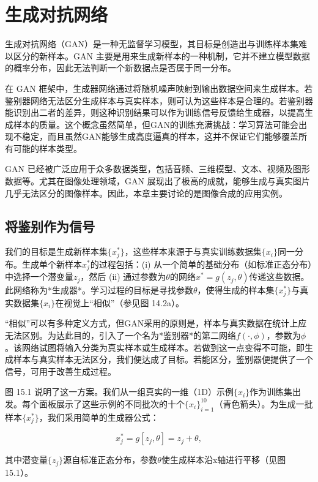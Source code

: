 \documentclass[lang=cn,newtx,10pt,scheme=chinese]{elegantbook}
\begin{document}
\chapter{生成对抗网络}

生成对抗网络（GAN）是一种无监督学习模型，其目标是创造出与训练样本集难以区分的新样本。GAN 主要是用来生成新样本的一种机制，它并不建立模型数据的概率分布，因此无法判断一个新数据点是否属于同一分布。

在 GAN 框架中，生成器网络通过将随机噪声映射到输出数据空间来生成样本。若鉴别器网络无法区分生成样本与真实样本，则可认为这些样本是合理的。若鉴别器能识别出二者的差异，则这种识别结果可以作为训练信号反馈给生成器，以提高生成样本的质量。这个概念虽然简单，但GAN的训练充满挑战：学习算法可能会出现不稳定，而且虽然GAN能够生成高度逼真的样本，这并不保证它们能够覆盖所有可能的样本类型。

GAN 已经被广泛应用于众多数据类型，包括音频、三维模型、文本、视频及图形数据等。尤其在图像处理领域，GAN 展现出了极高的成就，能够生成与真实图片几乎无法区分的图像样本。因此，本章主要讨论的是图像合成的应用实例。

\section{将鉴别作为信号}
我们的目标是生成新样本集\(\{x_j^*\}\)，这些样本来源于与真实训练数据集\(\{x_i\}\)同一分布。生成单个新样本\(x_j^*\)的过程包括：(i) 从一个简单的基础分布（如标准正态分布）中选择一个潜变量\(z_j\)，然后 (ii) 通过参数为\(\theta\)的网络\(x^* = g(z_j, \theta)\)传递这些数据。此网络称为*生成器*。学习过程的目标是寻找参数\(\theta\)，使得生成的样本集\(\{x_j^*\}\)与真实数据集\(\{x_i\}\)在视觉上“相似”（参见图 14.2a）。

“相似”可以有多种定义方式，但GAN采用的原则是，样本与真实数据在统计上应无法区别。为达此目的，引入了一个名为*鉴别器*的第二网络\(f(\cdot, \phi)\)，参数为\(\phi\)。该网络试图将输入分类为真实样本或生成样本。若做到这一点变得不可能，即生成样本与真实样本无法区分，我们便达成了目标。若能区分，鉴别器便提供了一个信号，可用于改善生成过程。

图 15.1 说明了这一方案。我们从一组真实的一维（1D）示例\(\{x_i\}\)作为训练集出发。每个面板展示了这些示例的不同批次的十个\(\{x_i\}^{10}_{i=1}\)（青色箭头）。为生成一批样本\(\{x_j^*\}\)，我们采用简单的生成器公式：

\begin{equation}
x_j^* = g[z_j, \theta] = z_j + \theta, 
\end{equation}

其中潜变量\(\{z_j\}\)源自标准正态分布，参数\(\theta\)使生成样本沿x轴进行平移（见图 15.1）。
\end{document}

